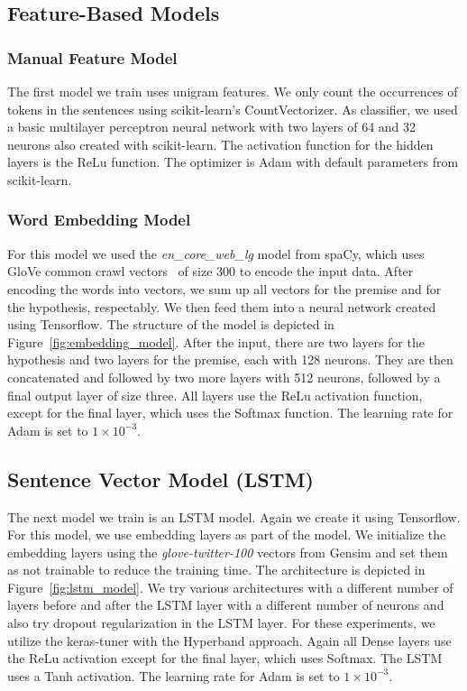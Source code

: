 \documentclass[acmsmall,nonacm]{acmart}
\begin{document}
\subsection{Feature-Based Models}

\subsubsection{Manual Feature Model}
The first model we train uses unigram features. We only count the occurrences of tokens in the sentences using scikit-learn's CountVectorizer. As classifier, we used a basic multilayer perceptron neural network with two layers of 64 and 32 neurons also created with scikit-learn. The activation function for the hidden layers is the ReLu function. The optimizer is Adam with default parameters from scikit-learn. 

\subsubsection{Word Embedding Model} %
For this model we used the \textit{en\_core\_web\_lg} model from spaCy, which uses GloVe common crawl vectors~\cite{glove-pennington2014} of size 300 to encode the input data. After encoding the words into vectors, we sum up all vectors for the premise and for the hypothesis, respectably. We then feed them into a neural network created using Tensorflow. The structure of the model is depicted in Figure~\ref{fig:embedding_model}. After the input, there are two layers for the hypothesis and two layers for the premise, each with 128 neurons. They are then concatenated and followed by two more layers with 512 neurons, followed by a final output layer of size three. All layers use the ReLu activation function, except for the final layer, which uses the Softmax function.  The learning rate for Adam is set to $1\times10^{-3}$.


\subsection{Sentence Vector Model (LSTM)} \label{sec:method_lstm}
The next model we train is an LSTM model. Again we create it using Tensorflow. 
For this model, we use embedding layers as part of the model. We initialize the embedding layers using the \textit{glove-twitter-100} vectors from Gensim and set them as not trainable to reduce the training time. The architecture is depicted in Figure~\ref{fig:lstm_model}.
We try various architectures with a different number of layers before and after the LSTM layer with a different number of neurons and also try dropout regularization in the LSTM layer. For these experiments, we utilize the keras-tuner with the Hyperband approach. Again all Dense layers use the ReLu activation except for the final layer, which uses Softmax. The LSTM uses a Tanh activation.  The learning rate for Adam is set to $1\times10^{-3}$.
\end{document}
